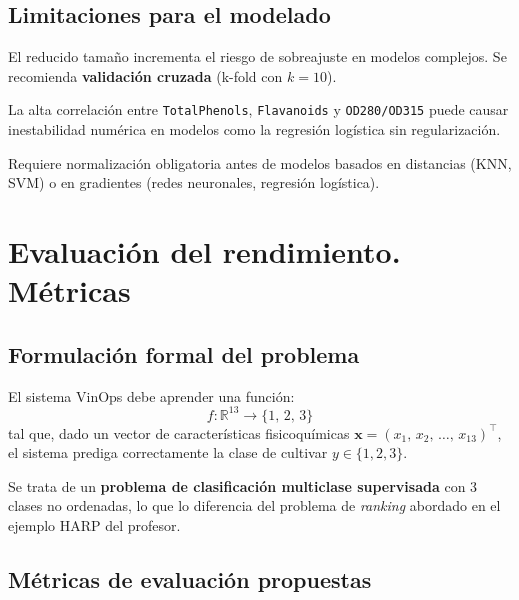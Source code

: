 \subsection{Limitaciones para el modelado}

\begin{description}[leftmargin=1.5cm, style=nextline]
    \item[Small data (178 instancias).]
    El reducido tama\~no incrementa el riesgo de sobreajuste en modelos complejos.
    Se recomienda \textbf{validaci\'on cruzada} (k-fold con $k=10$).

    \item[Multicolinealidad entre variables fen\'olicas.]
    La alta correlaci\'on entre \texttt{TotalPhenols}, \texttt{Flavanoids} y
    \texttt{OD280/OD315} puede causar inestabilidad num\'erica en modelos como la
    regresi\'on log\'istica sin regularizaci\'on.

    \item[Escalas heterog\'eneas.]
    Requiere normalizaci\'on obligatoria antes de modelos basados en distancias
    (KNN, SVM) o en gradientes (redes neuronales, regresi\'on log\'istica).
\end{description}

\section{Evaluaci\'on del rendimiento. M\'etricas}

\subsection{Formulaci\'on formal del problema}

El sistema VinOps debe aprender una funci\'on:
\[
    f\colon \mathbb{R}^{13} \rightarrow \{1,\,2,\,3\}
\]
tal que, dado un vector de caracter\'isticas fisicoqu\'imicas
$\mathbf{x} = (x_1,\, x_2,\, \ldots,\, x_{13})^{\top}$, el sistema prediga
correctamente la clase de cultivar $y \in \{1, 2, 3\}$.

Se trata de un \textbf{problema de clasificaci\'on multiclase supervisada} con 3
clases no ordenadas, lo que lo diferencia del problema de \textit{ranking} abordado
en el ejemplo HARP del profesor.

\subsection{M\'etricas de evaluaci\'on propuestas}

